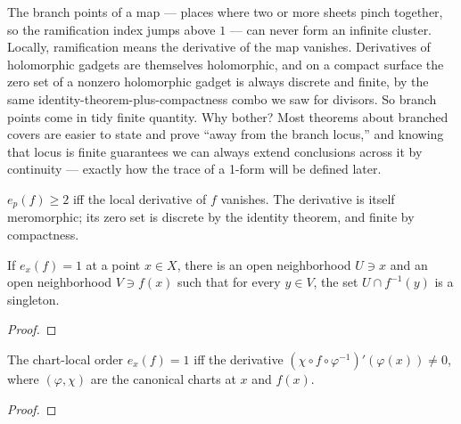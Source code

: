 \begin{layman}
The branch points of a map --- places where two or more sheets pinch
together, so the ramification index jumps above \(1\) --- can never form
an infinite cluster. Locally, ramification means the derivative of the
map vanishes. Derivatives of holomorphic gadgets are themselves
holomorphic, and on a compact surface the zero set of a nonzero
holomorphic gadget is always discrete and finite, by the same
identity-theorem-plus-compactness combo we saw for divisors. So branch
points come in tidy finite quantity. Why bother? Most theorems about
branched covers are easier to state and prove ``away from the branch
locus,'' and knowing that locus is finite guarantees we can always
extend conclusions across it by continuity --- exactly how the trace of a
1-form will be defined later.
\end{layman}

\begin{proofsketch}
\(e_p(f)\ge 2\) iff the local derivative of \(f\) vanishes. The
derivative is itself meromorphic; its zero set is discrete by the
identity theorem, and finite by compactness.
\end{proofsketch}

\begin{lemma}
\label{lem:local-inj-unramified}
If \(e_x(f)=1\) at a point \(x\in X\), there is an open neighborhood
\(U\ni x\) and an open neighborhood \(V\ni f(x)\) such that for every
\(y\in V\), the set \(U\cap f^{-1}(y)\) is a singleton.
\leanok
\end{lemma}
\begin{proof}\leanok\end{proof}

\begin{lemma}
\label{lem:order-eq-one-iff-deriv-ne-zero}
The chart-local order \(e_x(f)=1\) iff the derivative
\((\chi\circ f\circ\varphi^{-1})'(\varphi(x))\ne 0\), where
\((\varphi,\chi)\) are the canonical charts at \(x\) and \(f(x)\).
\leanok
\end{lemma}
\begin{proof}\leanok\end{proof}


